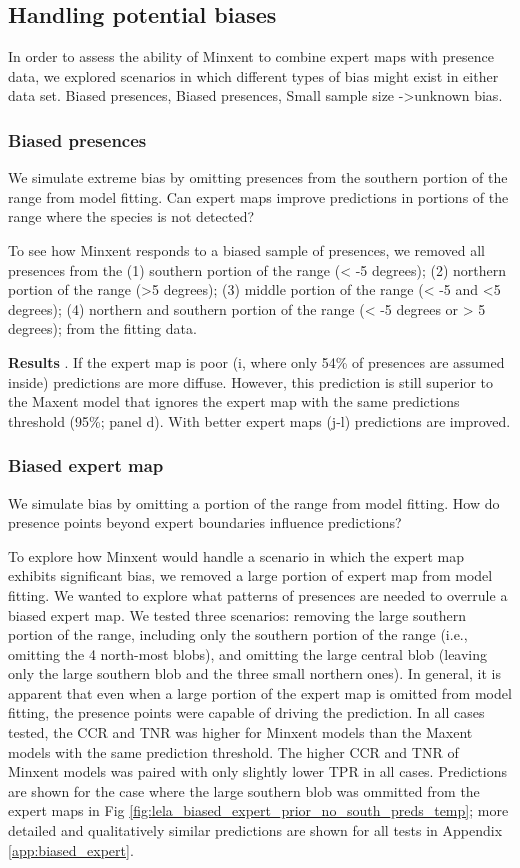 \subsection{Handling potential biases}
In order to assess the ability of Minxent to combine expert maps with presence data, we explored scenarios in which different types of bias might exist in either data set.  Biased presences, Biased presences, Small sample size ->unknown bias.


\subsubsection{Biased presences}%


We simulate extreme bias by omitting presences from the southern portion of the range from model fitting. Can expert maps improve predictions in portions of the range where the species is not detected?


To see how Minxent responds to a biased sample of presences, we removed all presences from the (1) southern portion of the range (< -5 degrees); (2) northern portion of the range (>5 degrees); (3) middle portion of the range (< -5  and <5 degrees); (4) northern and southern portion of the range (< -5 degrees or > 5 degrees);  from the fitting data. 


\textbf{Results} . If the expert map is poor (i, where only 54\% of presences are assumed inside) predictions are more diffuse. However, this prediction is still superior to the Maxent model that ignores the expert map with the same predictions threshold (95\%; panel d). With better expert maps (j-l) predictions are improved.


\subsubsection{Biased expert map}
We simulate bias by omitting a portion of the range from model fitting. How do presence points beyond expert boundaries influence predictions?


To explore how Minxent would handle a scenario in which the expert map exhibits significant bias, we removed a large portion of expert map from model fitting. We wanted to explore what patterns of presences are needed to overrule a biased expert map. We tested three scenarios: removing the large southern portion of the range, including only the southern portion of the range (i.e., omitting the 4 north-most blobs), and omitting the large central blob (leaving only the large southern blob and the three small northern ones). In general, it is apparent that even when a large portion of the expert map is omitted from model fitting, the presence points were capable of driving the prediction. In all cases tested, the CCR and TNR was higher for Minxent models than the Maxent models with the same prediction threshold. The higher CCR and TNR of Minxent models was paired with only slightly lower TPR in all cases. Predictions are shown for the case where the large southern blob was ommitted from the expert maps in Fig \ref{fig:lela_biased_expert_prior_no_south_preds_temp}; more detailed and qualitatively similar predictions are shown for all tests in Appendix \ref{app:biased_expert}.


